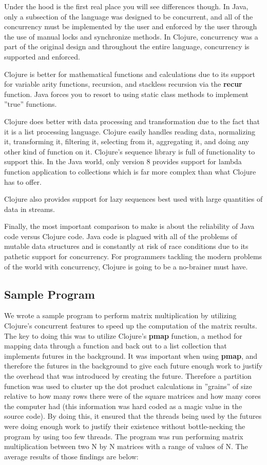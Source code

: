     Under the hood is the first real place you will see differences though. In Java, only a subsection of the language was designed to be concurrent, and all of the concurrency must be implemented by the user and enforced by the user through the use of manual locks and synchronize methods. In Clojure, concurrency was a part of the original design and throughout the entire language, concurrency is supported and enforced.
    
    Clojure is better for mathematical functions and calculations due to its support for variable arity functions, recursion, and stackless recursion via the \textbf{recur} function. Java forces you to resort to using static class methods to implement ''true'' functions.
    
    Clojure does better with data processing and transformation due to the fact that it is a list processing language. Clojure easily handles reading data, normalizing it, transforming it, filtering it, selecting from it, aggregating it, and doing any other kind of function on it. Clojure's sequence library is full of functionality to support this. In the Java world, only version 8 provides support for lambda function application to collections which is far more complex than what Clojure has to offer.
    
    Clojure also provides support for lazy sequences best used with large quantities of data in streams.
    
    Finally, the most important comparison to make is about the reliability of Java code versus Clojure code. Java code is plagued with all of the problems of mutable data structures and is constantly at risk of race conditions due to its pathetic support for concurrency. For programmers tackling the modern problems of the world with concurrency, Clojure is going to be a no-brainer must have.

\subsection{Sample Program}

    We wrote a sample program to perform matrix multiplication by utilizing Clojure's concurrent features to speed up the computation of the matrix results. The key to doing this was to utilize Clojure's \textbf{pmap} function, a method for mapping data through a function and back out to a list collection that implements futures in the background. \cite{ClojureDocumentation_pmap} It was important when using \textbf{pmap}, and therefore the futures in the background to give each future enough work to justify the overhead that was introduced by creating the future. Therefore a partition function was used to cluster up the dot product calculations in ''grains'' of size relative to how many rows there were of the square matrices and how many cores the computer had (this information was hard coded as a magic value in the source code).
    By doing this, it ensured that the threads being used by the futures were doing enough work to justify their existence without bottle-necking the program by using too few threads. The program was run performing matrix multiplication between two N by N matrices with a range of values of N. The average results of those findings are below:
    
